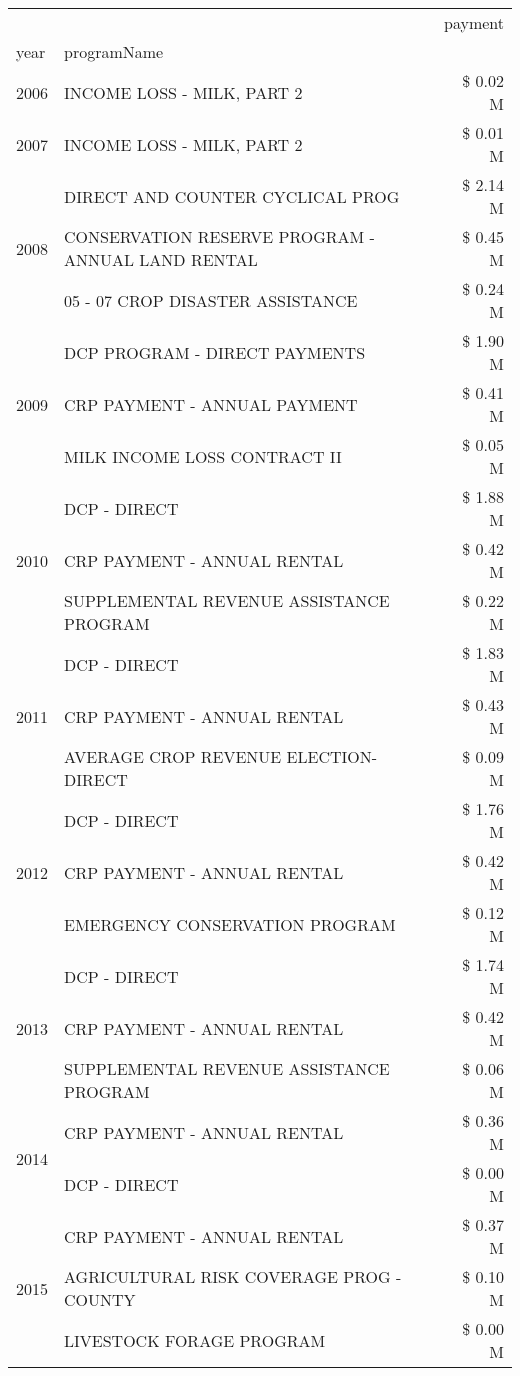 \begin{tabular}{llr}
\toprule
 &  & payment \\
year & programName &  \\
\midrule
2006 & INCOME LOSS - MILK, PART 2 & \$ 0.02 M \\
\cline{1-3}
2007 & INCOME LOSS - MILK, PART 2 & \$ 0.01 M \\
\cline{1-3}
\multirow[t]{3}{*}{2008} & DIRECT AND COUNTER CYCLICAL PROG & \$ 2.14 M \\
 & CONSERVATION RESERVE PROGRAM - ANNUAL LAND RENTAL & \$ 0.45 M \\
 & 05 - 07 CROP DISASTER ASSISTANCE & \$ 0.24 M \\
\cline{1-3}
\multirow[t]{3}{*}{2009} & DCP PROGRAM - DIRECT PAYMENTS & \$ 1.90 M \\
 & CRP PAYMENT - ANNUAL PAYMENT & \$ 0.41 M \\
 & MILK INCOME LOSS CONTRACT II & \$ 0.05 M \\
\cline{1-3}
\multirow[t]{3}{*}{2010} & DCP - DIRECT & \$ 1.88 M \\
 & CRP PAYMENT - ANNUAL RENTAL & \$ 0.42 M \\
 & SUPPLEMENTAL REVENUE ASSISTANCE PROGRAM & \$ 0.22 M \\
\cline{1-3}
\multirow[t]{3}{*}{2011} & DCP - DIRECT & \$ 1.83 M \\
 & CRP PAYMENT - ANNUAL RENTAL & \$ 0.43 M \\
 & AVERAGE CROP REVENUE ELECTION-DIRECT & \$ 0.09 M \\
\cline{1-3}
\multirow[t]{3}{*}{2012} & DCP - DIRECT & \$ 1.76 M \\
 & CRP PAYMENT - ANNUAL RENTAL & \$ 0.42 M \\
 & EMERGENCY CONSERVATION PROGRAM & \$ 0.12 M \\
\cline{1-3}
\multirow[t]{3}{*}{2013} & DCP - DIRECT & \$ 1.74 M \\
 & CRP PAYMENT - ANNUAL RENTAL & \$ 0.42 M \\
 & SUPPLEMENTAL REVENUE ASSISTANCE PROGRAM & \$ 0.06 M \\
\cline{1-3}
\multirow[t]{2}{*}{2014} & CRP PAYMENT - ANNUAL RENTAL & \$ 0.36 M \\
 & DCP - DIRECT & \$ 0.00 M \\
\cline{1-3}
\multirow[t]{3}{*}{2015} & CRP PAYMENT - ANNUAL RENTAL & \$ 0.37 M \\
 & AGRICULTURAL RISK COVERAGE PROG - COUNTY & \$ 0.10 M \\
 & LIVESTOCK FORAGE PROGRAM & \$ 0.00 M \\

\end{tabular}
